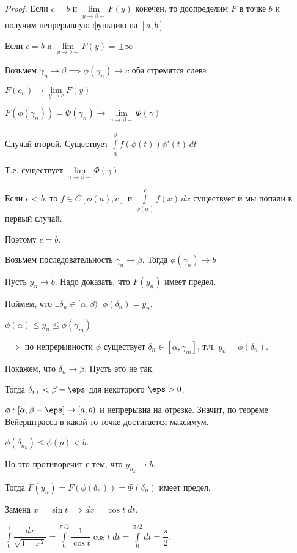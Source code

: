\begin{properties}
\begin{enumerate}
\begin{proof}
			Если $c=b$ и $\lim\limits_{y \to \beta-} F(y)$ конечен, то доопределим $F$ в точке $b$ и получим непрерывную функцию на $[a,b]$
			
			Если $c= b$ и $\lim\limits_{y\to b-} F(y) = \pm\infty$
			\fi	
			
			Возьмем $\gamma_n \to \beta \implies \phi(\gamma_n) \to c$ оба стремятся слева
			
			$F(c_n) \to \lim\limits_{y \to c} F(y)$
			
			$F(\phi(\gamma_n)) = \Phi(\gamma_n) \to \lim\limits_{\gamma \to \beta-} \Phi(\gamma)$
			
			
			Случай второй. Существует $\int\limits_{\alpha}^{\beta} f(\phi(t))\phi'(t) \,dt$
			
			Т.е. существует $\lim\limits_{\gamma \to \beta-} \Phi(\gamma)$
			
			Если $c < b$, то $f\in C[\phi(a), c]$ и $\int\limits_{\phi(\alpha)}^{c} f(x) \, dx$ существует и мы попали в первый случай.
			
			Поэтому $c=b$. 
			
			Возьмем последовательность $\gamma_n \to \beta$. Тогда $\phi(\gamma_n) \to b$
			
			Пусть $y_n \to b$. Надо доказать, что $F(y_n)$ имеет предел.
			
			Поймем, что $\exists \delta_n \in [\alpha, \beta) \;\; \phi(\delta_n) = y_n$.
			
			$\phi(\alpha) \le y_n \le \phi(\gamma_m)$
			
			$\implies$ по непрерывности $\phi$ существует $\delta_n \in[\alpha, \gamma_m]$, т.ч. $y_n = \phi(\delta_n)$.
			
			Покажем, что $\delta_n \to \beta$. Пусть это не так.
			
			Тогда $\delta_{n_k} < \beta - \eps$ для некоторого $\eps > 0$.
			
			$\phi : [\alpha, \beta-\eps] \to [a,b)$ и непрерывна на отрезке. Значит, по теореме Вейерштрасса в какой-то точке достигается максимум. 
			
			$\phi(\delta_{n_k})\le \phi(p) < b$. 
			
			Но это противоречит с тем, что $y_{n_k} \to b$. 
			
			Тогда $F(y_n) = F(\phi(\delta_n)) = \Phi(\delta_n)$ имеет предел.
			
			
		\end{proof}
	
		\begin{example}\slashns
		
			Замена $x = \sin{t} \implies dx = \cos{t} \; dt$.
		
			$\int\limits_0^1 \dfrac{dx}{\sqrt{1-x^2}} = \int\limits_0^{\pi/2} \dfrac{1}{\cos{t}} \cos{t} \; dt =  \int\limits_0^{\pi/2} dt = \dfrac{\pi}{2}.$
		\end{example}
				
	\end{enumerate}	
\end{properties}

